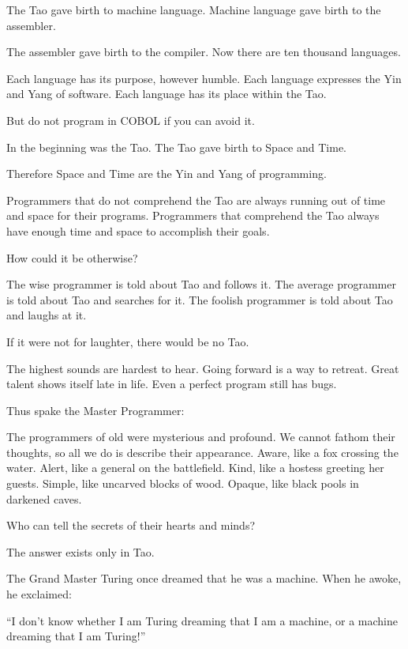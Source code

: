 The Tao gave birth to machine language. Machine language gave birth to the assembler.

The assembler gave birth to the compiler. Now there are ten thousand languages.

Each language has its purpose, however humble. Each language expresses the Yin and Yang of software. Each language has its place within the Tao.

But do not program in COBOL if you can avoid it.

In the beginning was the Tao. The Tao gave birth to Space and Time.

Therefore Space and Time are the Yin and Yang of programming.

Programmers that do not comprehend the Tao are always running out of time and space for their programs. Programmers that comprehend the Tao always have enough time and space to accomplish their goals.

How could it be otherwise?

The wise programmer is told about Tao and follows it. The average programmer is told about Tao and searches for it. The foolish programmer is told about Tao and laughs at it.

If it were not for laughter, there would be no Tao.

The highest sounds are hardest to hear. Going forward is a way to retreat. Great talent shows itself late in life. Even a perfect program still has bugs.

Thus spake the Master Programmer:

The programmers of old were mysterious and profound. We cannot fathom their thoughts, so all we do is describe their appearance.
\startverse%
Aware, like a fox crossing the water.
Alert, like a general on the battlefield.
Kind, like a hostess greeting her guests.
Simple, like uncarved blocks of wood.
Opaque, like black pools in darkened caves.
\endverse

Who can tell the secrets of their hearts and minds?

The answer exists only in Tao.

The Grand Master Turing once dreamed that he was a machine. When he awoke, he exclaimed:

``I don't know whether I am Turing dreaming that I am a machine, or a machine dreaming that I am Turing!''

